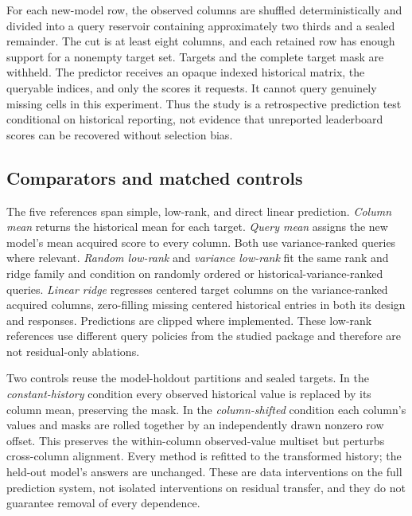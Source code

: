 \documentclass{article}
\begin{document}
For each new-model row, the observed columns are shuffled deterministically and divided into a query reservoir containing approximately two thirds and a sealed remainder. The cut is at least eight columns, and each retained row has enough support for a nonempty target set. Targets and the complete target mask are withheld. The predictor receives an opaque indexed historical matrix, the queryable indices, and only the scores it requests. It cannot query genuinely missing cells in this experiment. Thus the study is a retrospective prediction test conditional on historical reporting, not evidence that unreported leaderboard scores can be recovered without selection bias.

\subsection{Comparators and matched controls}
The five references span simple, low-rank, and direct linear prediction. \emph{Column mean} returns the historical mean for each target. \emph{Query mean} assigns the new model's mean acquired score to every column. Both use variance-ranked queries where relevant. \emph{Random low-rank} and \emph{variance low-rank} fit the same rank and ridge family and condition on randomly ordered or historical-variance-ranked queries. \emph{Linear ridge} regresses centered target columns on the variance-ranked acquired columns, zero-filling missing centered historical entries in both its design and responses. Predictions are clipped where implemented. These low-rank references use different query policies from the studied package and therefore are not residual-only ablations.

Two controls reuse the model-holdout partitions and sealed targets. In the \emph{constant-history} condition every observed historical value is replaced by its column mean, preserving the mask. In the \emph{column-shifted} condition each column's values and masks are rolled together by an independently drawn nonzero row offset. This preserves the within-column observed-value multiset but perturbs cross-column alignment. Every method is refitted to the transformed history; the held-out model's answers are unchanged. These are data interventions on the full prediction system, not isolated interventions on residual transfer, and they do not guarantee removal of every dependence.
\end{document}
